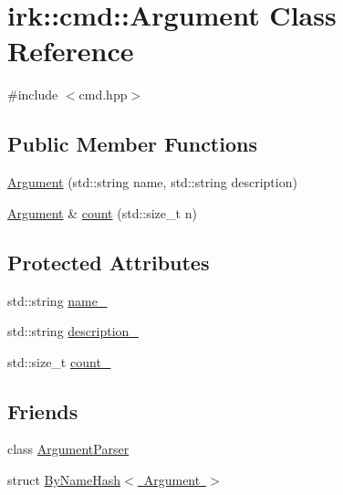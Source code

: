\hypertarget{classirk_1_1cmd_1_1Argument}{}\section{irk\+:\+:cmd\+:\+:Argument Class Reference}
\label{classirk_1_1cmd_1_1Argument}


{\ttfamily \#include $<$cmd.\+hpp$>$}

\subsection*{Public Member Functions}
\begin{DoxyCompactItemize}
\item 
\mbox{\hyperlink{classirk_1_1cmd_1_1Argument_a43d3ea0c345b3cf68aafc4c46897d685}{Argument}} (std\+::string name, std\+::string description)
\item 
\mbox{\hyperlink{classirk_1_1cmd_1_1Argument}{Argument}} \& \mbox{\hyperlink{classirk_1_1cmd_1_1Argument_a7e91c299cfd894da2b5200173b62eac5}{count}} (std\+::size\+\_\+t n)
\end{DoxyCompactItemize}
\subsection*{Protected Attributes}
\begin{DoxyCompactItemize}
\item 
std\+::string \mbox{\hyperlink{classirk_1_1cmd_1_1Argument_ad6b66658e47667e49c9df69571607e58}{name\+\_\+}}
\item 
std\+::string \mbox{\hyperlink{classirk_1_1cmd_1_1Argument_ad9952908f0990069b18e556f747068f8}{description\+\_\+}}
\item 
std\+::size\+\_\+t \mbox{\hyperlink{classirk_1_1cmd_1_1Argument_a627a9563b7efc3c87adb1c6156019f84}{count\+\_\+}}
\end{DoxyCompactItemize}
\subsection*{Friends}
\begin{DoxyCompactItemize}
\item 
class \mbox{\hyperlink{classirk_1_1cmd_1_1Argument_a55c9e1ac006a645af402e3aee6b64e00}{Argument\+Parser}}
\item 
struct \mbox{\hyperlink{classirk_1_1cmd_1_1Argument_a6821014d75c5475d97122c1be09079d8}{By\+Name\+Hash$<$ Argument $>$}}
\end{DoxyCompactItemize}


